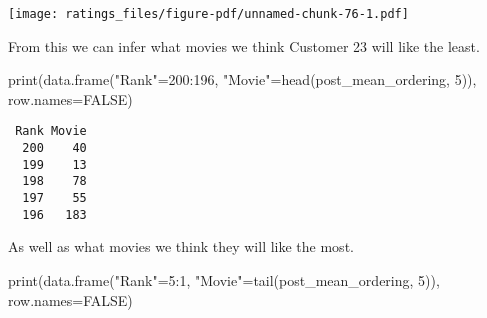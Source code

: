 \documentclass[
  letterpaper,
  DIV=11,
  numbers=noendperiod]{scrartcl}
\newenvironment{Shaded}{\begin{snugshade}}{\end{snugshade}}
\newcommand{\AttributeTok}[1]{\textcolor[rgb]{0.40,0.45,0.13}{#1}}
\newcommand{\ConstantTok}[1]{\textcolor[rgb]{0.56,0.35,0.01}{#1}}
\newcommand{\ControlFlowTok}[1]{\textcolor[rgb]{0.00,0.23,0.31}{#1}}
\newcommand{\DecValTok}[1]{\textcolor[rgb]{0.68,0.00,0.00}{#1}}
\newcommand{\FunctionTok}[1]{\textcolor[rgb]{0.28,0.35,0.67}{#1}}
\newcommand{\NormalTok}[1]{\textcolor[rgb]{0.00,0.23,0.31}{#1}}
\newcommand{\OtherTok}[1]{\textcolor[rgb]{0.00,0.23,0.31}{#1}}
\newcommand{\SpecialCharTok}[1]{\textcolor[rgb]{0.37,0.37,0.37}{#1}}
\newcommand{\StringTok}[1]{\textcolor[rgb]{0.13,0.47,0.30}{#1}}
\begin{document}
\begin{Shaded}
\end{Shaded}

\texttt{[image: ratings\_files/figure-pdf/unnamed-chunk-76-1.pdf]}

From this we can infer what movies we think Customer 23 will like the
least.

\begin{Shaded}
\begin{Highlighting}[]
\FunctionTok{print}\NormalTok{(}\FunctionTok{data.frame}\NormalTok{(}\StringTok{"Rank"}\OtherTok{=}\DecValTok{200}\SpecialCharTok{:}\DecValTok{196}\NormalTok{,}
                 \StringTok{"Movie"}\OtherTok{=}\FunctionTok{head}\NormalTok{(post\_mean\_ordering, }\DecValTok{5}\NormalTok{)),}
      \AttributeTok{row.names=}\ConstantTok{FALSE}\NormalTok{)}
\end{Highlighting}
\end{Shaded}

\begin{verbatim}
 Rank Movie
  200    40
  199    13
  198    78
  197    55
  196   183
\end{verbatim}

As well as what movies we think they will like the most.

\begin{Shaded}
\begin{Highlighting}[]
\FunctionTok{print}\NormalTok{(}\FunctionTok{data.frame}\NormalTok{(}\StringTok{"Rank"}\OtherTok{=}\DecValTok{5}\SpecialCharTok{:}\DecValTok{1}\NormalTok{,}
                 \StringTok{"Movie"}\OtherTok{=}\FunctionTok{tail}\NormalTok{(post\_mean\_ordering, }\DecValTok{5}\NormalTok{)),}
      \AttributeTok{row.names=}\ConstantTok{FALSE}\NormalTok{)}
\end{Highlighting}
\end{Shaded}
\end{document}
